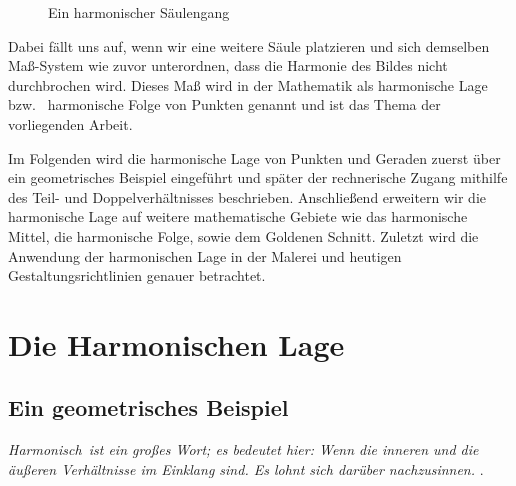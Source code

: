 \documentclass[12pt,a4paper]{article}
\begin{document}
\begin{figure}[htbp]
 \hfill
{}
\caption{Ein harmonischer Säulengang}
\label{fig:saeulen}
\end{figure}

Dabei fällt uns auf, wenn wir eine weitere Säule platzieren und sich demselben Maß-System wie zuvor unterordnen, dass die Harmonie des Bildes nicht durchbrochen wird. Dieses Maß wird in der Mathematik als harmonische Lage bzw.~ harmonische Folge von Punkten genannt und ist das Thema der vorliegenden Arbeit.

Im Folgenden wird die harmonische Lage von Punkten und Geraden zuerst über ein geometrisches Beispiel eingeführt und später der rechnerische Zugang mithilfe des Teil- und Doppelverhältnisses beschrieben. Anschließend erweitern wir die harmonische Lage auf weitere mathematische Gebiete wie das harmonische Mittel, die harmonische Folge, sowie dem Goldenen Schnitt. Zuletzt wird die Anwendung der harmonischen Lage in der Malerei und heutigen Gestaltungsrichtlinien genauer betrachtet.

\newpage
\section{Die Harmonischen Lage}
\label{subsec:dieHarmonischeLage}

\subsection{Ein geometrisches Beispiel}
\textit{\glqq Harmonisch\grqq ~ist ein großes Wort; es bedeutet hier: Wenn die inneren und die äußeren Verhältnisse im Einklang sind. Es lohnt sich darüber nachzusinnen.} \citep[S.~53]{projektiveGeometrie}.
\end{document}
